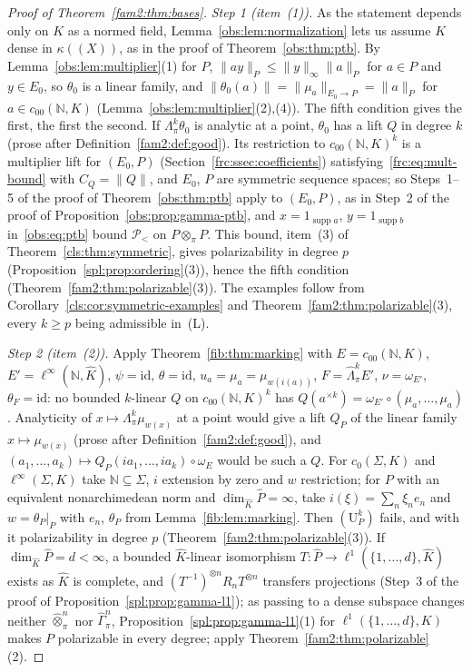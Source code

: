 \documentclass[11pt]{amsart}
\theoremstyle{definition}
\theoremstyle{remark}
\numberwithin{equation}{section}
\newcommand{\N}{\mathbb N}
\newcommand{\linf}{\ell^\infty}
\newcommand{\id}{\mathrm{id}}
\newcommand{\norm}[1]{\lVert #1\rVert}
\newcommand{\Kh}{\widehat K}
\theoremstyle{plain}
\theoremstyle{definition}
\theoremstyle{plain}
\newcommand{\hot}{\mathbin{\widehat\otimes}}
\newcommand{\hLambda}{\widehat\Lambda}
\newcommand{\hGamma}{\widehat\Gamma}
\newcommand{\cP}{\mathcal P}
\begin{document}
\begin{proof}[Proof of Theorem~\ref{fam2:thm:bases}]
\emph{Step 1 (item~(1)).} As the statement depends only on $K$ as a normed field, Lemma~\ref{obs:lem:normalization} lets us
assume $K$ dense in $\kappa((X))$, as in the proof of Theorem~\ref{obs:thm:ptb}. By Lemma~\ref{obs:lem:multiplier}(1) for
$P$, $\norm{ay}_P\le\norm y_\infty\norm a_P$ for $a\in P$ and $y\in E_0$, so $\theta_0$ is a linear family, and
$\norm{\theta_0(a)}=\norm{\mu_a}_{E_0\to P}=\norm a_P$ for $a\in c_{00}(\N,K)$ (Lemma~\ref{obs:lem:multiplier}(2),(4)). The
fifth condition gives the first, the first the second. If $\Lambda^k_\pi\theta_0$ is analytic at a point, $\theta_0$ has a
lift $Q$ in degree $k$ (prose after Definition~\ref{fam2:def:good}). Its restriction to $c_{00}(\N,K)^k$ is a multiplier lift for
$(E_0,P)$ (Section~\ref{frc:ssec:coefficients}) satisfying~\eqref{frc:eq:mult-bound} with $C_Q=\norm Q$, and $E_0$, $P$ are
symmetric sequence spaces; so Steps~1--5 of the proof of Theorem~\ref{obs:thm:ptb} apply to $(E_0,P)$, as in Step~2 of the
proof of Proposition~\ref{obs:prop:gamma-ptb}, and $x=1_{\operatorname{supp}a}$, $y=1_{\operatorname{supp}b}$
in~\eqref{obs:eq:ptb} bound $\cP_<$ on $P\otimes_\pi P$. This bound, item~(3) of Theorem~\ref{cls:thm:symmetric}, gives
polarizability in degree $p$ (Proposition~\ref{spl:prop:ordering}(3)), hence the fifth condition
(Theorem~\ref{fam2:thm:polarizable}(3)). The examples follow from Corollary~\ref{cls:cor:symmetric-examples} and
Theorem~\ref{fam2:thm:polarizable}(3), every $k\ge p$ being admissible in~(L).

\emph{Step 2 (item~(2)).} Apply Theorem~\ref{fib:thm:marking} with $E=c_{00}(\N,K)$, $E'=\linf(\N,\Kh)$, $\psi=\id$,
$\theta=\id$, $u_a=\mu_a=\mu_{w(i(a))}$, $F=\hLambda^k_\pi E'$, $\nu=\omega_{E'}$, $\theta_F=\id$: no bounded $k$-linear $Q$ on
$c_{00}(\N,K)^k$ has $Q(a^{\times k})=\omega_{E'}\circ(\mu_a,\dots,\mu_a)$. Analyticity of $x\mapsto\Lambda^k_\pi\mu_{w(x)}$
at a point would give a lift $Q_P$ of the linear family $x\mapsto\mu_{w(x)}$ (prose after Definition~\ref{fam2:def:good}),
and $(a_1,\dots,a_k)\mapsto Q_P(ia_1,\dots,ia_k)\circ\omega_E$ would be such a $Q$. For $c_0(\Sigma,K)$ and
$\linf(\Sigma,K)$ take $\N\subseteq\Sigma$, $i$ extension by zero and $w$ restriction; for $P$
with an equivalent nonarchimedean norm and $\dim_{\Kh}\widehat P=\infty$, take $i(\xi)=\sum_n\xi_ne_n$ and $w=\theta_P|_P$
with $e_n$, $\theta_P$ from Lemma~\ref{fib:lem:marking}. Then $(\mathrm U^k_P)$ fails, and with it polarizability in degree
$p$ (Theorem~\ref{fam2:thm:polarizable}(3)). If $\dim_{\Kh}\widehat P=d<\infty$, a bounded $\Kh$-linear isomorphism
$T\colon\widehat P\to\ell^1(\{1,\dots,d\},\Kh)$ exists as $\Kh$ is complete, and $(T^{-1})^{\otimes n}R_nT^{\otimes n}$
transfers projections (Step~3 of the proof of Proposition~\ref{spl:prop:gamma-l1}); as passing to a dense subspace changes
neither $\hot^n_\pi$ nor $\hGamma^n_\pi$, Proposition~\ref{spl:prop:gamma-l1}(1) for $\ell^1(\{1,\dots,d\},K)$ makes $P$
polarizable in every degree; apply Theorem~\ref{fam2:thm:polarizable}(2).
\end{proof}
\end{document}
